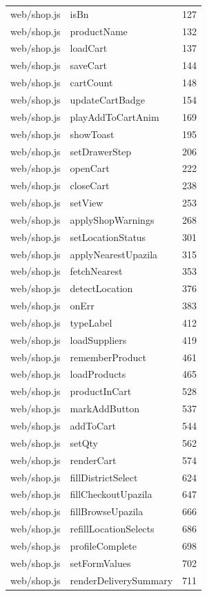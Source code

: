 \begin{center}
\begin{longtable}{@{}p{4.6cm}p{5.2cm}c@{}}
web/shop.js & isBn & 127 \\
web/shop.js & productName & 132 \\
web/shop.js & loadCart & 137 \\
web/shop.js & saveCart & 144 \\
web/shop.js & cartCount & 148 \\
web/shop.js & updateCartBadge & 154 \\
web/shop.js & playAddToCartAnim & 169 \\
web/shop.js & showToast & 195 \\
web/shop.js & setDrawerStep & 206 \\
web/shop.js & openCart & 222 \\
web/shop.js & closeCart & 238 \\
web/shop.js & setView & 253 \\
web/shop.js & applyShopWarnings & 268 \\
web/shop.js & setLocationStatus & 301 \\
web/shop.js & applyNearestUpazila & 315 \\
web/shop.js & fetchNearest & 353 \\
web/shop.js & detectLocation & 376 \\
web/shop.js & onErr & 383 \\
web/shop.js & typeLabel & 412 \\
web/shop.js & loadSuppliers & 419 \\
web/shop.js & rememberProduct & 461 \\
web/shop.js & loadProducts & 465 \\
web/shop.js & productInCart & 528 \\
web/shop.js & markAddButton & 537 \\
web/shop.js & addToCart & 544 \\
web/shop.js & setQty & 562 \\
web/shop.js & renderCart & 574 \\
web/shop.js & fillDistrictSelect & 624 \\
web/shop.js & fillCheckoutUpazila & 647 \\
web/shop.js & fillBrowseUpazila & 666 \\
web/shop.js & refillLocationSelects & 686 \\
web/shop.js & profileComplete & 698 \\
web/shop.js & setFormValues & 702 \\
web/shop.js & renderDeliverySummary & 711 \\

\end{longtable}
\end{center}
